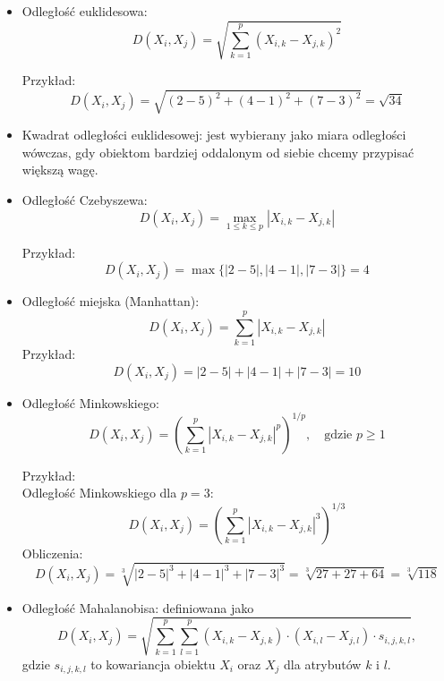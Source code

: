 \documentclass{article}
\begin{document}
\begin{itemize}
    \item Odległość euklidesowa:
    \[
    D(X_i, X_j) = \sqrt{\sum_{k=1}^{p}(X_{i,k} - X_{j,k})^2}
    \]

    Przykład:
    \[
    D(X_i, X_j) = \sqrt{(2-5)^2 + (4-1)^2 + (7-3)^2} = \sqrt{34}
    \]
    
    \item Kwadrat odległości euklidesowej: jest wybierany jako miara odległości wówczas, gdy obiektom bardziej oddalonym od siebie chcemy przypisać większą wagę.
    
    \item Odległość Czebyszewa:
    \[
    D(X_i, X_j) = \max_{1 \leq k \leq p} |X_{i,k} - X_{j,k}|
    \]

    Przykład:
    \[
    D(X_i, X_j) = \max\{|2-5|, |4-1|, |7-3|\} = 4
    \]
    
    \item Odległość miejska (Manhattan):
    \[
    D(X_i, X_j) = \sum_{k=1}^{p}|X_{i,k} - X_{j,k}|
    \]
    Przykład:
    \[
    D(X_i, X_j) = |2-5| + |4-1| + |7-3| = 10
    \]

    \item Odległość Minkowskiego:
    \[
    D(X_i, X_j) = \left(\sum_{k=1}^{p}|X_{i,k} - X_{j,k}|^p\right)^{1/p}, \quad \text{gdzie } p \geq 1
    \]

    Przykład: \\
    Odległość Minkowskiego dla \( p = 3 \):
    \[
    D(X_i, X_j) = \left(\sum_{k=1}^{p} |X_{i,k} - X_{j,k}|^3\right)^{1/3}
    \]
    Obliczenia:
    \[
    D(X_i, X_j) = \sqrt[3]{|2-5|^3 + |4-1|^3 + |7-3|^3} = \sqrt[3]{27 + 27 + 64} = \sqrt[3]{118}
    \]

    \item Odległość Mahalanobisa: definiowana jako
    \[
    D(X_i, X_j) = \sqrt{\sum_{k=1}^{p}\sum_{l=1}^{p}(X_{i,k} - X_{j,k}) \cdot (X_{i,l} - X_{j,l}) \cdot s_{i,j,k,l}},
    \]
    gdzie $s_{i,j,k,l}$ to kowariancja obiektu $X_i$ oraz $X_j$ dla atrybutów $k$ i $l$.

\end{itemize}
\end{document}
